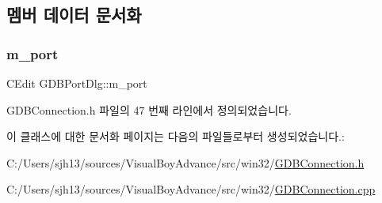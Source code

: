 \subsection{멤버 데이터 문서화}
\mbox{\label{class_g_d_b_port_dlg_a243e7307371feed3fe058cbf822c3cb0}} 
\subsubsection{\texorpdfstring{m\+\_\+port}{m\_port}}
{\footnotesize\ttfamily C\+Edit G\+D\+B\+Port\+Dlg\+::m\+\_\+port}



G\+D\+B\+Connection.\+h 파일의 47 번째 라인에서 정의되었습니다.



이 클래스에 대한 문서화 페이지는 다음의 파일들로부터 생성되었습니다.\+:\begin{DoxyCompactItemize}
\item 
C\+:/\+Users/sjh13/sources/\+Visual\+Boy\+Advance/src/win32/\mbox{\hyperlink{_g_d_b_connection_8h}{G\+D\+B\+Connection.\+h}}\item 
C\+:/\+Users/sjh13/sources/\+Visual\+Boy\+Advance/src/win32/\mbox{\hyperlink{_g_d_b_connection_8cpp}{G\+D\+B\+Connection.\+cpp}}\end{DoxyCompactItemize}

